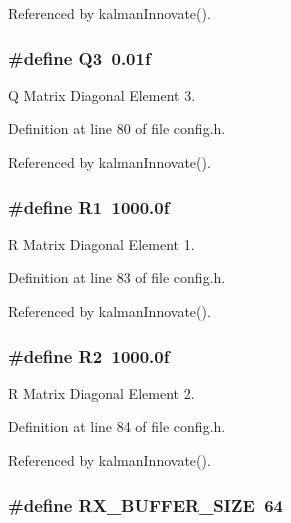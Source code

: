 Referenced by kalman\-Innovate().

\hypertarget{group__config_ga1d7d3dfd2c4618949c484c5e8369f05a}{
\subsubsection[{Q3}]{\setlength{\rightskip}{0pt plus 5cm}\#define Q3~0.\-01f}}\label{group__config_ga1d7d3dfd2c4618949c484c5e8369f05a}


Q Matrix Diagonal Element 3. 



Definition at line 80 of file config.\-h.



Referenced by kalman\-Innovate().

\hypertarget{group__config_ga918f64eb53db8e8dc694f36a87646476}{
\subsubsection[{R1}]{\setlength{\rightskip}{0pt plus 5cm}\#define R1~1000.\-0f}}\label{group__config_ga918f64eb53db8e8dc694f36a87646476}


R Matrix Diagonal Element 1. 



Definition at line 83 of file config.\-h.



Referenced by kalman\-Innovate().

\hypertarget{group__config_ga7a255a2815b9453060f51c6eb22cfed8}{
\subsubsection[{R2}]{\setlength{\rightskip}{0pt plus 5cm}\#define R2~1000.\-0f}}\label{group__config_ga7a255a2815b9453060f51c6eb22cfed8}


R Matrix Diagonal Element 2. 



Definition at line 84 of file config.\-h.



Referenced by kalman\-Innovate().

\hypertarget{group__config_ga739a2a1a0047c98ac1b18ecd25dac092}{
\subsubsection[{R\-X\-\_\-\-B\-U\-F\-F\-E\-R\-\_\-\-S\-I\-Z\-E}]{\setlength{\rightskip}{0pt plus 5cm}\#define R\-X\-\_\-\-B\-U\-F\-F\-E\-R\-\_\-\-S\-I\-Z\-E~64}}\label{group__config_ga739a2a1a0047c98ac1b18ecd25dac092}


